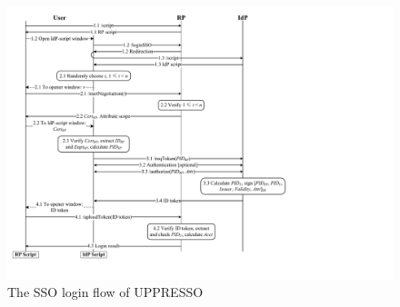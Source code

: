 












\begin{figure}[htb]
  \centering
  \includegraphics[height=0.575\textheight]{fig/process-js.pdf}
  \caption{The SSO login flow of UPPRESSO}
  \label{fig:process}
\end{figure}



